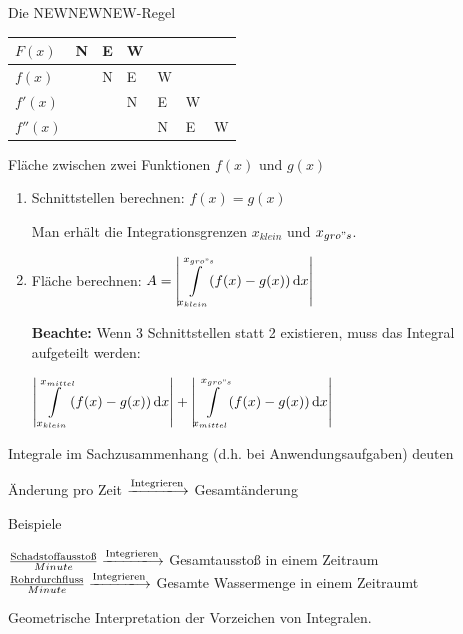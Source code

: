 \documentclass[paper=a6,landscape,ngerman,twoside=true,fontsize=12pt]{scrartcl}
\begin{document}
\begin{frage}
	Die NEWNEWNEW-Regel
\end{frage}
\begin{antwort}
\begin{tabular}{C{1.2cm}|C{1.2cm}|C{1.2cm}|C{1.2cm}|C{1.2cm}|C{1.2cm}|C{1.2cm}}
	$F(x)$      & N & E & W &   &   &   \\ \hline
	$f(x)$      &   & N & E & W &   &   \\ \hline
	$f'(x)$     &   &   & N & E & W &   \\ \hline
	$f''(x)$    &   &   &   & N & E & W
\end{tabular}
\end{antwort}

\begin{frage}
	Fläche zwischen zwei Funktionen $f(x)$ und $g(x)$
\end{frage}
\begin{antwort}
		\large
		\begin{enumerate} 
			\item Schnittstellen berechnen: $f(x)=g(x)$
			
			Man erhält die Integrationsgrenzen $x_{klein}$ und $x_{gro{"s}}$.
			\item Fläche berechnen: 
				$A=\left\vert\displaystyle\int\limits_{x_{klein}}^{x_{gro{"s}}} \! (f(x)-g(x)) \, \mathrm{d}x\right\vert$
			
			\textbf{Beachte:} \Large Wenn 3 Schnittstellen statt 2 existieren, muss das Integral aufgeteilt werden:
			
				$\left\vert\displaystyle\int\limits_{x_{klein}}^{x_{mittel}} \! (f(x)-g(x)) \, \mathrm{d}x\right\vert+\left\vert\displaystyle\int\limits_{x_{mittel}}^{x_{gro{"s}}} \! (f(x)-g(x)) \, \mathrm{d}x\right\vert$
		\end{enumerate} 
\end{antwort}
\begin{frage}
	Integrale im Sachzusammenhang (d.h. bei Anwendungsaufgaben) deuten
\end{frage}
\begin{antwort}
	Änderung pro Zeit $\xlongrightarrow{\text{Integrieren}}$ Gesamtänderung 
	
	\bigskip Beispiele
	
	\large\bigskip
	$\frac{\text{Schadstoffausstoß}}{Minute} \xlongrightarrow{\text{Integrieren}}$ Gesamtausstoß in einem Zeitraum
	$\frac{\text{Rohrdurchfluss}}{Minute} \xlongrightarrow{\text{Integrieren}}$ Gesamte Wassermenge in einem Zeitraumt
\end{antwort}
\begin{frage}
	Geometrische Interpretation der Vorzeichen von Integralen.
\end{frage}
\end{document}
